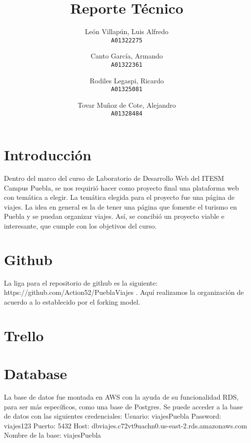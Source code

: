 \documentclass{article}
\title{Reporte Técnico}
\author{
  León Villapún, Luis Alfredo\\
  \texttt{A01322275}
  \and
  Canto García, Armando\\
  \texttt{A01322361}
  \and
  Rodiles Legaspi, Ricardo\\
  \texttt{A01325081}
  \and
  Tovar Muñoz de Cote, Alejandro\\
  \texttt{A01328484}
}
\begin{document}
	\maketitle
	\newpage
	
	\tableofcontents
	\newpage
	
	\section{Introducción}
	Dentro del marco del curso de Laboratorio de Desarrollo Web del ITESM Campus Puebla, se nos requirió hacer como proyecto final una plataforma web con temática a elegir.
	\linebreak
	La temática elegida para el proyecto fue una página de viajes. La idea en general es la de tener una página que fomente el turismo en Puebla y se puedan organizar viajes.
	\linebreak
	Así, se concibió un proyecto viable e interesante, que cumple con los objetivos del curso.
			
			
	\section{Github}
	La liga para el repositorio de github es la siguiente: https://github.com/Action52/PueblaViajes .
	\linebreak
	Aquí realizamos la organización de acuerdo a lo establecido por el forking model.
	
	
	\section{Trello}

	
	
	\section{Database}
	La base de datos fue montada en AWS con la ayuda de su funcionalidad RDS, para ser más específicos, como una base de Postgres.
	Se puede acceder a la base de datos con las siguientes credenciales:
	\linebreak
	Usuario: viajesPuebla
	\linebreak
	Password: viajes123
	\linebreak
	Puerto: 5432
	\linebreak
	Host: dbviajes.c72vt9uachn0.us-east-2.rds.amazonaws.com
	\linebreak
	Nombre de la base: viajesPuebla
	
\end{document}
